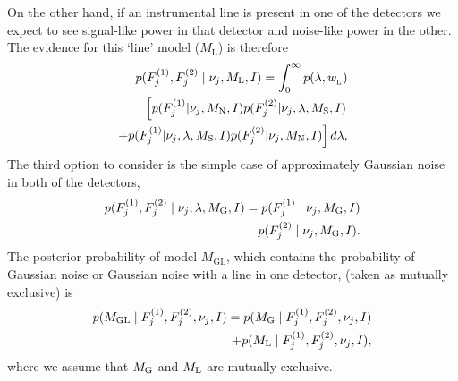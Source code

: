 On the other hand, if an instrumental line is present in one of the detectors we expect to see signal-like power in that detector and noise-like power in the other.  The evidence for this `line' model ($M_{\text{L}}$) is therefore
%
\begin{equation}
\label{las:line}
\begin{split}
p(F^{(1)}_{j},F^{(2)}_{j} \mid \nu_j,M_{\rm{L}},I) = \int_0^{\infty}  p(\lambda,w_{\rm_L}) \\
\left[ p(F^{(1)}_{j}|\nu_j,M_{\rm{N}},I)p(F^{(2)}_{j}|\nu_j,\lambda,M_{\rm{S}},I) \right. \\
\left. + p(F^{(1)}_{j}|\nu_j,\lambda,M_{\rm{S}},I)p(F^{(2)}_{j}|\nu_j,M_{\rm{N}},I)\right]d\lambda ,
\end{split}
\end{equation}
%
The third option to consider is the simple case of approximately Gaussian noise in both of the detectors,
%
\begin{equation}
\label{las:noise}
\begin{split}
p(F^{(1)}_{j},F^{(2)}_{j} \mid \nu_j,\lambda,M_{\rm{G}},I) = p(F^{(1)}_{j} \mid \nu_j,M_{\rm{G}},I) \\
p(F^{(2)}_{j} \mid \nu_j,M_{\rm{G}},I) .
\end{split}
\end{equation}
The posterior probability of model $M_{\text{GL}}$, which contains the probability of Gaussian noise or Gaussian noise with a line in one detector, (taken as mutually exclusive) is
\begin{equation}
\begin{split}
p(M_{\rm{GL}} \mid F^{(1)}_{j},F^{(2)}_{j},\nu_j ,I) = p(M_{\rm{G}} \mid F^{(1)}_{j},F^{(2)}_{j},\nu_j ,I) \\
+p(M_{\rm{L}} \mid F^{(1)}_{j},F^{(2)}_{j} ,\nu_j, I),
\end{split}
\end{equation}
where we assume that $M_{\rm{G}}$ and $M_{\rm{L}}$ are mutually exclusive.

